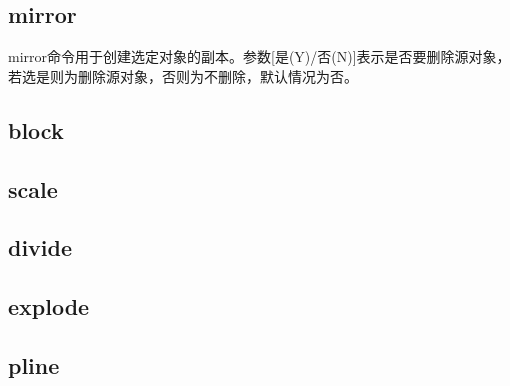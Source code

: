 \subsection{mirror}
mirror命令用于创建选定对象的副本。参数[是(Y)/否(N)]表示是否要删除源对象，若选是则为删除源对象，否则为不删除，默认情况为否。
\subsection{block}
\subsection{scale}
\subsection{divide}
\subsection{explode}
\subsection{pline}
\endinput
